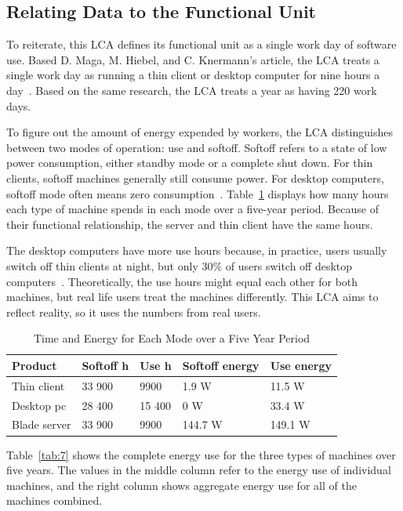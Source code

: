 \documentclass[final,journal,10pt,letterpaper,oneside,twocolumn,compsoc]%
{IEEEtran}
\begin{document}
\subsection{Relating Data to the Functional Unit}
To reiterate, this LCA defines its functional
unit as a single work day of software use. Based D. Maga, M. Hiebel, and C.
Knermann's article, the LCA treats a single work day as running a thin
client or desktop computer for nine hours a day~\cite{maga}. Based on the same
research, the LCA treats a year as having 220 work days.

To figure out the amount of energy expended by workers, the LCA distinguishes
between two modes of operation: use and softoff. Softoff refers to a state of
low power consumption, either standby mode or a complete shut down. For thin
clients,
softoff machines generally still consume power. For desktop
computers, softoff mode often means zero consumption~\cite{client}. Table~\ref{tab:6}
displays how many hours each type of machine spends in each mode over a
five-year period. Because of their functional relationship, the server and thin
client have the same hours.

The desktop computers have more use hours because, in practice, users usually
switch off thin clients at night, but only 30\% of users switch off desktop
computers~\cite{client}. Theoretically, the use hours might equal each other for
both
machines, but real life users treat the machines differently. This LCA aims to
reflect reality, so it uses the numbers from real users.

\begin{table}[htbp]
  \caption{Time and Energy for Each Mode over a Five Year Period}
  \label{tab:6}
  \centering
    \begin{tabular}{| l | l | l | l | l |}
      \hline
      Product & Softoff h & Use h & Softoff energy & Use energy \\
      \hline
      Thin client  & 33 900 & 9900  & 1.9 W   & 11.5 W \\
      Desktop pc   & 28 400 & 15 400 & 0 W     & 33.4 W \\
      Blade server & 33 900 & 9900  & 144.7 W & 149.1 W \\
      \hline
    \end{tabular}
\end{table}

Table~\ref{tab:7} shows the complete energy use for the three types of machines
over five years. The values in the middle column refer to the energy use of
individual machines, and the right column shows aggregate energy use for all of
the machines combined.
\end{document}

